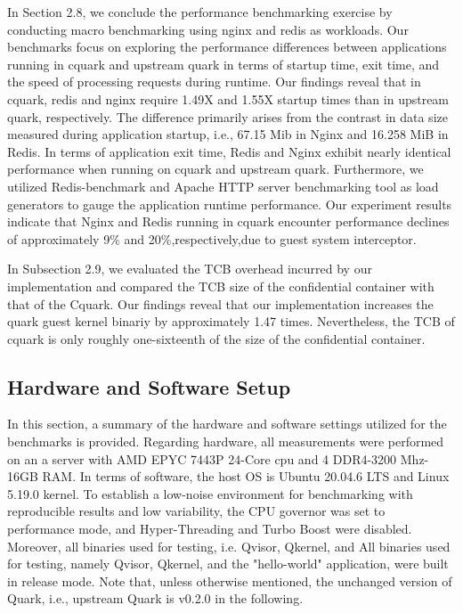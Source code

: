 In Section 2.8, we conclude the performance benchmarking exercise by conducting macro benchmarking using nginx and redis as workloads. Our benchmarks focus on exploring the performance differences between applications running in cquark and upstream quark in terms of startup time, exit time, and the speed of processing requests during runtime. Our findings reveal that in cquark, redis and nginx require 1.49X and 1.55X startup times than in upstream quark, respectively. The difference primarily arises from the contrast in data size measured during application startup, i.e., 67.15 Mib in Nginx and 16.258 MiB in Redis. In terms of application exit time, Redis and Nginx exhibit nearly identical performance when running on cquark and upstream quark. Furthermore, we utilized Redis-benchmark and Apache HTTP server benchmarking tool as load generators to gauge the application runtime performance. Our experiment results indicate that Nginx and Redis running in cquark encounter performance declines of approximately 9\% and 20\%,respectively,due to guest system interceptor.

In Subsection 2.9, we evaluated the TCB overhead incurred by our implementation and compared the TCB size of the confidential container with that of the Cquark. Our findings reveal that our implementation increases the quark guest kernel binariy by approximately 1.47 times. Nevertheless, the TCB of cquark is only roughly one-sixteenth of the size of the confidential container.

\subsection{Hardware and Software Setup}

In this section, a summary of the hardware and software settings utilized for the benchmarks is provided. Regarding hardware, all measurements were performed on an a server with AMD EPYC 7443P 24-Core cpu and 4 DDR4-3200 Mhz-16GB RAM. In terms of software, the host OS is Ubuntu 20.04.6 LTS and Linux 5.19.0 kernel. To establish a low-noise environment for benchmarking with reproducible results and low variability, the CPU governor was set to performance mode, and Hyper-Threading and Turbo Boost were disabled.  Moreover, all binaries used for testing, i.e. Qvisor, Qkernel, and All binaries used for testing, namely Qvisor, Qkernel, and the "hello-world" application, were built in release mode. Note that, unless otherwise mentioned, the unchanged version of Quark, i.e., upstream Quark is v0.2.0 in the following.


